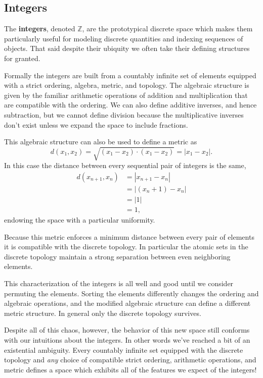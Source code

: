 \documentclass[
  letterpaper,
  DIV=11,
  numbers=noendperiod]{scrartcl}
\begin{document}
\hypertarget{integers}{%
\subsection{Integers}\label{integers}}

The \textbf{integers}, denoted \(\mathbb{Z}\), are the prototypical
discrete space which makes them particularly useful for modeling
discrete quantities and indexing sequences of objects. That said despite
their ubiquity we often take their defining structures for granted.

Formally the integers are built from a countably infinite set of
elements equipped with a strict ordering, algebra, metric, and topology.
The algebraic structure is given by the familiar arithmetic operations
of addition and multiplication that are compatible with the ordering. We
can also define additive inverses, and hence subtraction, but we cannot
define division because the multiplicative inverses don't exist unless
we expand the space to include fractions.

This algebraic structure can also be used to define a metric as \[
d(x_{1}, x_{2})
= \sqrt{ (x_{1} - x_{2}) \cdot (x_{1} - x_{2}) }
= | x_{1} - x_{2} |.
\] In this case the distance between every sequential pair of integers
is the same, \begin{align*}
d(x_{n + 1}, x_{n})
&= | x_{n + 1} - x_{n} |
\\
&= | (x_{n} + 1) - x_{n} |
\\
&= | 1 |
\\
&= 1,
\end{align*} endowing the space with a particular uniformity.

Because this metric enforces a minimum distance between every pair of
elements it is compatible with the discrete topology. In particular the
atomic sets in the discrete topology maintain a strong separation
between even neighboring elements.

This characterization of the integers is all well and good until we
consider permuting the elements. Sorting the elements differently
changes the ordering and algebraic operations, and the modified
algebraic structure can define a different metric structure. In general
only the discrete topology survives.

Despite all of this chaos, however, the behavior of this new space still
conforms with our intuitions about the integers. In other words we've
reached a bit of an existential ambiguity. Every countably infinite set
equipped with the discrete topology and \emph{any} choice of compatible
strict ordering, arithmetic operations, and metric defines a space which
exhibits all of the features we expect of the integers!
\end{document}
